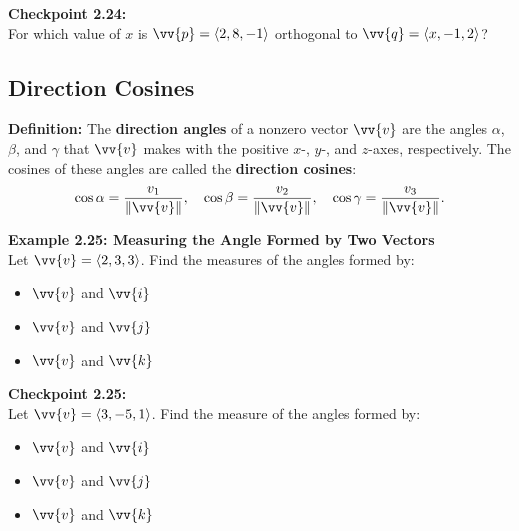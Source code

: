 \documentclass{article}
\begin{document}
\begin{exercisebox}
    \textbf{Checkpoint 2.24:} \\
    For which value of \(x\) is \(\vv{p} = \langle 2, 8, -1 \rangle\) orthogonal to \(\vv{q} = \langle x, -1, 2 \rangle\)?
\end{exercisebox}

\subsection*{Direction Cosines}

\begin{definitionbox}
    \textbf{Definition:} The \textbf{direction angles} of a nonzero vector \(\vv{v}\) are the angles \(\alpha\), \(\beta\), and \(\gamma\) that \(\vv{v}\) makes with the positive \(x\)-, \(y\)-, and \(z\)-axes, respectively. The cosines of these angles are called the \textbf{direction cosines}:
    \[
    \cos \alpha = \frac{v_1}{\|\vv{v}\|}, \quad \cos \beta = \frac{v_2}{\|\vv{v}\|}, \quad \cos \gamma = \frac{v_3}{\|\vv{v}\|}.
    \]
\end{definitionbox}

\begin{examplebox}
    \textbf{Example 2.25: Measuring the Angle Formed by Two Vectors} \\
    Let \(\vv{v} = \langle 2, 3, 3 \rangle\). Find the measures of the angles formed by:
    \begin{itemize}
        \item \(\vv{v}\) and \(\vv{i}\)
        \item \(\vv{v}\) and \(\vv{j}\)
        \item \(\vv{v}\) and \(\vv{k}\)
    \end{itemize}
\end{examplebox}

\begin{exercisebox}
    \textbf{Checkpoint 2.25:} \\
    Let \(\vv{v} = \langle 3, -5, 1 \rangle\). Find the measure of the angles formed by:
    \begin{itemize}
        \item \(\vv{v}\) and \(\vv{i}\)
        \item \(\vv{v}\) and \(\vv{j}\)
        \item \(\vv{v}\) and \(\vv{k}\)
    \end{itemize}
\end{exercisebox}
\end{document}
